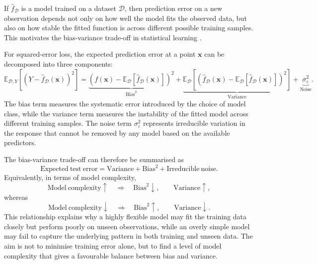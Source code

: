 \noindent
If \(\widehat{f}_{\mathcal{D}}\) is a model trained on a dataset
\(\mathcal{D}\), then prediction error on a new observation depends not only on
how well the model fits the observed data, but also on how stable the fitted
function is across different possible training samples. This motivates the
bias-variance trade-off in statistical learning
\citep{hastie2009elements,james2021introduction,bishop2006pattern}.

\noindent
For squared-error loss, the expected prediction error at a point
\(\mathbf{x}\) can be decomposed into three components:
\begin{equation}
\label{eq:bias_variance_pointwise}
\mathbb{E}_{\mathcal{D},Y}
\!\left[
\left(
Y - \widehat{f}_{\mathcal{D}}(\mathbf{x})
\right)^2
\right]
=
\underbrace{\left(
f(\mathbf{x})
-
\mathbb{E}_{\mathcal{D}}
\!\left[
\widehat{f}_{\mathcal{D}}(\mathbf{x})
\right]
\right)^2}_{\mathrm{Bias}^{2}}
+
\underbrace{
\mathbb{E}_{\mathcal{D}}
\!\left[
\left(
\widehat{f}_{\mathcal{D}}(\mathbf{x})
-
\mathbb{E}_{\mathcal{D}}
\!\left[
\widehat{f}_{\mathcal{D}}(\mathbf{x})
\right]
\right)^2
\right]
}_{\mathrm{Variance}}
+
\underbrace{\sigma_{\varepsilon}^{2}}_{\mathrm{Noise}}.
\end{equation}
The bias term measures the systematic error introduced by the choice of model
class, while the variance term measures the instability of the fitted model
across different training samples. The noise term
\(\sigma_{\varepsilon}^{2}\) represents irreducible variation in the response
that cannot be removed by any model based on the available predictors.

\noindent
The bias-variance trade-off can therefore be summarised as
\[
    \mathrm{Expected\ test\ error}
    =
    \mathrm{Variance}
    +
    \mathrm{Bias}^{2}
    +
    \mathrm{Irreducible\ noise}.
\]
Equivalently, in terms of model complexity,
\[
    \mathrm{Model\ complexity}\uparrow
    \quad
    \Longrightarrow
    \quad
    \mathrm{Bias}^{2}\downarrow,
    \qquad
    \mathrm{Variance}\uparrow,
\]
whereas
\[
    \mathrm{Model\ complexity}\downarrow
    \quad
    \Longrightarrow
    \quad
    \mathrm{Bias}^{2}\uparrow,
    \qquad
    \mathrm{Variance}\downarrow.
\]
This relationship explains why a highly flexible model may fit the training data
closely but perform poorly on unseen observations, while an overly simple model
may fail to capture the underlying pattern in both training and unseen data. The
aim is not to minimise training error alone, but to find a level of model
complexity that gives a favourable balance between bias and variance.


